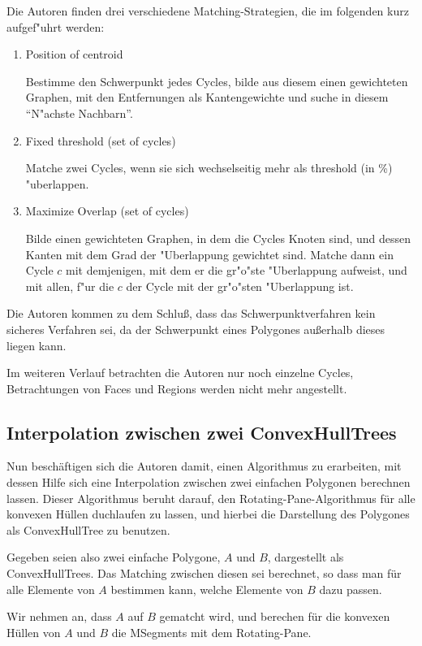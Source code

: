 Die Autoren finden drei verschiedene Matching-Strategien, die im folgenden kurz aufgef"uhrt werden:
\begin{enumerate}
\item Position of centroid \label{MatchSchwer}

Bestimme den Schwerpunkt jedes Cycles,  bilde aus diesem einen gewichteten Graphen, mit den Entfernungen als Kantengewichte und suche in diesem "`N"achste Nachbarn"'.
\item Fixed threshold (set of cycles)

Matche zwei Cycles, wenn sie sich wechselseitig  mehr als threshold (in \%) "uberlappen.

\item Maximize Overlap (set of cycles)

Bilde einen gewichteten Graphen, in dem die Cycles Knoten sind, und dessen Kanten mit dem Grad der "Uberlappung gewichtet sind. Matche dann ein Cycle $c$ mit demjenigen, mit dem er die gr"o"ste "Uberlappung aufweist, und mit allen, f"ur die $c$ der Cycle mit der gr"o"sten "Uberlappung ist.
\end{enumerate} 

Die Autoren kommen zu dem Schluß, dass das Schwerpunktverfahren kein sicheres Verfahren sei, da der Schwerpunkt eines Polygones außerhalb dieses liegen kann.

Im weiteren Verlauf betrachten die Autoren nur noch einzelne Cycles, Betrachtungen von Faces und Regions werden nicht mehr angestellt.

\subsection{Interpolation zwischen zwei ConvexHullTrees}

Nun beschäftigen sich die Autoren damit, einen Algorithmus zu erarbeiten, mit dessen Hilfe sich eine Interpolation zwischen zwei einfachen Polygonen berechnen lassen. Dieser Algorithmus beruht darauf, den Rotating-Pane-Algorithmus für alle konvexen Hüllen duchlaufen zu lassen, und hierbei die Darstellung des Polygones als ConvexHullTree zu benutzen.

Gegeben seien also zwei einfache Polygone, $A$ und $B$, dargestellt als ConvexHullTrees. Das Matching zwischen diesen sei berechnet, so dass man für alle Elemente von $A$ bestimmen kann, welche Elemente von $B$ dazu passen.

Wir nehmen an, dass $A$ auf $B$ gematcht wird, und berechen für die konvexen Hüllen von $A$ und $B$ die MSegments mit dem  Rotating-Pane. 

